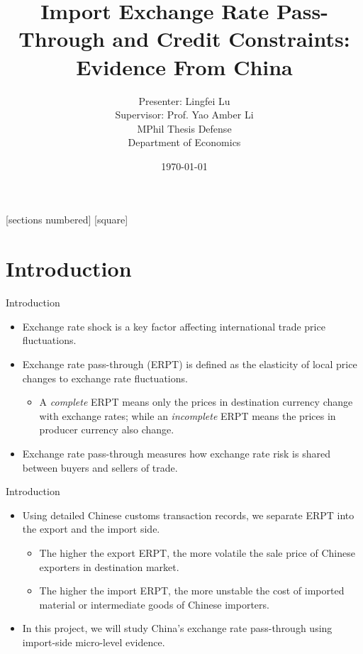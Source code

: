 \documentclass[10pt]{beamer}
\title[MPhil Thesis]{Import Exchange Rate Pass-Through and Credit Constraints: Evidence From China}
\author[Lingfei Lu]{\large Presenter: Lingfei Lu \\ \vspace{0.4cm} Supervisor: Prof. Yao Amber Li\\ \vspace{0.4cm} MPhil Thesis Defense \\ \vspace{0.4cm} Department of Economics}
\date{\today}
\begin{document}
	
\begin{frame}[plain]
	\maketitle {}
\end{frame}


[sections numbered] 
[square] 

\section{Introduction}

\begin{frame}{Introduction}
	\begin{itemize}
		\item Exchange rate shock is a key factor affecting international trade price fluctuations.
		\item Exchange rate pass-through (ERPT) is defined as the elasticity of local price changes to exchange rate fluctuations.
		\begin{itemize}
			\item A \textit{complete} ERPT means only the prices in destination currency change with exchange rates; while an \textit{incomplete} ERPT means the prices in producer currency also change.
		\end{itemize}
		\item Exchange rate pass-through measures how exchange rate risk is shared between buyers and sellers of trade.	
	\end{itemize}
\end{frame}

\begin{frame}{Introduction}
	\begin{itemize}
		\item Using detailed Chinese customs transaction records, we separate ERPT into the export and the import side.
		\begin{itemize}
			\item The higher the export ERPT, the more volatile the sale price of Chinese exporters in destination market.
			\item The higher the import ERPT, the more unstable the cost of imported material or intermediate goods of Chinese importers.
		\end{itemize}
		\item In this project, we will study China's exchange rate pass-through using import-side micro-level evidence.	
	\end{itemize}
\end{frame}
\end{document}
